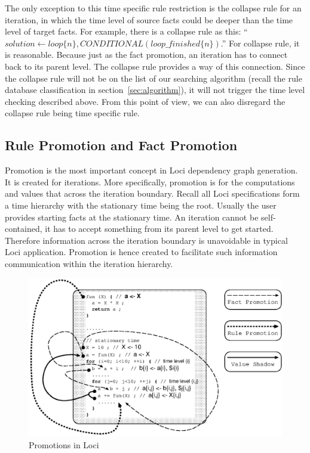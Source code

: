 \documentclass{article}
\begin{document}
The only exception to this time specific rule restriction is the
collapse rule for an iteration, in which the time level of source
facts could be deeper than the time level of target facts. For
example, there is a collapse rule as this: 
``$solution \gets loop\{n\}, CONDITIONAL(loop\_finished\{n\})$.'' For
collapse rule, it is reasonable. Because just as the fact promotion,
an iteration has to connect back to its parent level. The collapse
rule provides a way of this connection. Since the collapse rule will
not be on the list of our searching algorithm (recall the rule
database classification in section~\ref{sec:algorithm}), it will not
trigger the time level checking described above. From this point of
view, we can also disregard the collapse rule being time specific
rule. 

\subsection{Rule Promotion and Fact Promotion}
\label{sec:promote}
Promotion is the most important concept in Loci dependency graph
generation. It is created for iterations. More specifically, promotion
is for the computations and values that across the iteration
boundary. Recall all Loci specifications form a time hierarchy with
the stationary time being the root. Usually the user provides starting
facts at the stationary time. An iteration cannot be self-contained,
it has to accept something from its parent level to get
started. Therefore information across the iteration boundary is
unavoidable in typical Loci application. Promotion is hence created to
facilitate such information communication within the iteration
hierarchy. 

\begin{figure}[htbp]
  \begin{center}
    \includegraphics[width=5in]{promote}
    \caption{Promotions in Loci}
    \label{promote}
  \end{center}
\end{figure}
\end{document}
